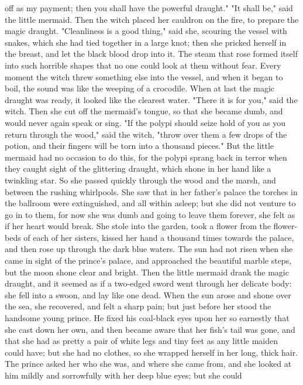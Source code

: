 off as my payment; then you shall have the powerful draught."
    "It shall be," said the little mermaid.
    Then the witch placed her cauldron on the fire, to prepare the
magic draught.
    "Cleanliness is a good thing," said she, scouring the vessel
with snakes, which she had tied together in a large knot; then she
pricked herself in the breast, and let the black blood drop into it.
The steam that rose formed itself into such horrible shapes that no
one could look at them without fear. Every moment the witch threw
something else into the vessel, and when it began to boil, the sound
was like the weeping of a crocodile. When at last the magic draught
was ready, it looked like the clearest water. "There it is for you,"
said the witch. Then she cut off the mermaid's tongue, so that she
became dumb, and would never again speak or sing. "If the polypi
should seize hold of you as you return through the wood," said the
witch, "throw over them a few drops of the potion, and their fingers
will be torn into a thousand pieces." But the little mermaid had no
occasion to do this, for the polypi sprang back in terror when they
caught sight of the glittering draught, which shone in her hand like a
twinkling star.
    So she passed quickly through the wood and the marsh, and
between the rushing whirlpools. She saw that in her father's palace
the torches in the ballroom were extinguished, and all within
asleep; but she did not venture to go in to them, for now she was dumb
and going to leave them forever, she felt as if her heart would break.
She stole into the garden, took a flower from the flower-beds of
each of her sisters, kissed her hand a thousand times towards the
palace, and then rose up through the dark blue waters. The sun had not
risen when she came in sight of the prince's palace, and approached
the beautiful marble steps, but the moon shone clear and bright.
Then the little mermaid drank the magic draught, and it seemed as if a
two-edged sword went through her delicate body: she fell into a swoon,
and lay like one dead. When the sun arose and shone over the sea,
she recovered, and felt a sharp pain; but just before her stood the
handsome young prince. He fixed his coal-black eyes upon her so
earnestly that she cast down her own, and then became aware that her
fish's tail was gone, and that she had as pretty a pair of white
legs and tiny feet as any little maiden could have; but she had no
clothes, so she wrapped herself in her long, thick hair. The prince
asked her who she was, and where she came from, and she looked at
him mildly and sorrowfully with her deep blue eyes; but she could
